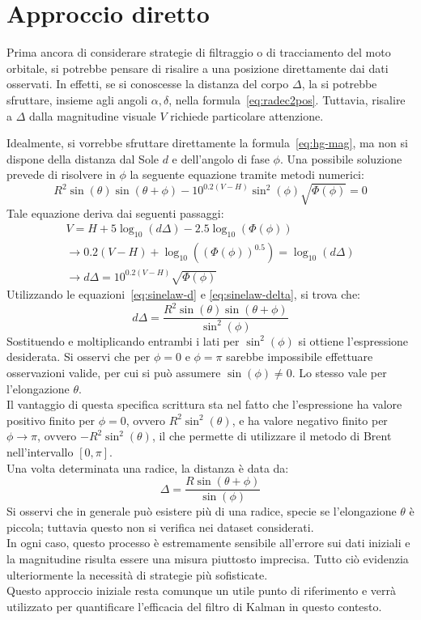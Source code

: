 \documentclass[12pt,a4paper,openright,twoside]{book}
\begin{document}
\section{Approccio diretto}\label{sec:naive}

Prima ancora di considerare strategie di filtraggio o di tracciamento del moto orbitale, si potrebbe pensare di risalire a una posizione direttamente dai dati osservati. In effetti, se si conoscesse la distanza del corpo $\Delta$, la si potrebbe sfruttare, insieme agli angoli $\alpha,\delta$, nella formula~\ref{eq:radec2pos}. Tuttavia, risalire a $\Delta$ dalla magnitudine visuale $V$ richiede particolare attenzione.

Idealmente, si vorrebbe sfruttare direttamente la formula~\ref{eq:hg-mag}, ma non si dispone della distanza dal Sole $d$ e dell'angolo di fase $\phi$. Una possibile soluzione prevede di risolvere in $\phi$ la seguente equazione tramite metodi numerici:
\begin{equation}
R^2\sin(\theta)\sin(\theta+\phi)-10^{0.2(V-H)}\sin^2(\phi)\sqrt{\Phi(\phi)}=0
\end{equation}
Tale equazione deriva dai seguenti passaggi:
\begin{gather*}
V=H+5\log_{10}(d\Delta)-2.5\log_{10}(\Phi(\phi)) \\
\rightarrow 0.2(V-H)+\log_{10}\left((\Phi(\phi))^{0.5}\right)=\log_{10}(d\Delta) \\
\rightarrow d\Delta=10^{0.2(V-H)}\sqrt{\Phi(\phi)}
\end{gather*}
Utilizzando le equazioni~\ref{eq:sinelaw-d} e \ref{eq:sinelaw-delta}, si trova che:
\begin{equation*}
d\Delta=\dfrac{R^2\sin(\theta)\sin(\theta+\phi)}{\sin^2(\phi)}
\end{equation*}
Sostituendo e moltiplicando entrambi i lati per $\sin^2(\phi)$ si ottiene l'espressione desiderata. Si osservi che per $\phi=0$ e $\phi=\pi$ sarebbe impossibile effettuare osservazioni valide, per cui si può assumere $\sin(\phi)\neq0$. Lo stesso vale per l'elongazione $\theta$. \\
Il vantaggio di questa specifica scrittura sta nel fatto che l'espressione ha valore positivo finito per $\phi=0$, ovvero $R^2\sin^2(\theta)$, e ha valore negativo finito per $\phi\to\pi$, ovvero $-R^2\sin^2(\theta)$, il che permette di utilizzare il metodo di Brent nell'intervallo $[0,\pi]$. \\
Una volta determinata una radice, la distanza è data da:
\begin{equation}
\Delta=\dfrac{R\sin(\theta+\phi)}{\sin(\phi)}
\end{equation}
Si osservi che in generale può esistere più di una radice, specie se l'elongazione $\theta$ è piccola; tuttavia questo non si verifica nei dataset considerati. \\
In ogni caso, questo processo è estremamente sensibile all'errore sui dati iniziali e la magnitudine risulta essere una misura piuttosto imprecisa. Tutto ciò evidenzia ulteriormente la necessità di strategie più sofisticate. \\
Questo approccio iniziale resta comunque un utile punto di riferimento e verrà utilizzato per quantificare l'efficacia del filtro di Kalman in questo contesto.
\end{document}
